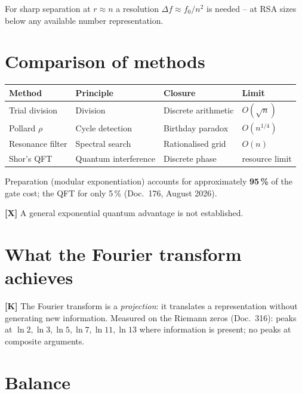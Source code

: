 For sharp separation at $r \approx n$ a resolution $\Delta f \approx
f_0/n^2$ is needed -- at RSA sizes below any available number
representation.

\section{Comparison of methods}

\begin{center}
\begin{tabular}{llll}
\toprule
Method & Principle & Closure & Limit \\
\midrule
Trial division & Division & Discrete arithmetic & $O(\sqrt{n})$ \\
Pollard $\rho$ & Cycle detection & Birthday paradox & $O(n^{1/4})$ \\
Resonance filter & Spectral search & Rationalised grid & $O(n)$ \\
Shor's QFT & Quantum interference & Discrete phase &
  resource limit \\
\bottomrule
\end{tabular}
\end{center}

Preparation (modular exponentiation) accounts for approximately
\textbf{95\,\%} of the gate cost; the QFT for only 5\,\%
(Doc.~176, August 2026).

\textbf{[X]} A general exponential quantum advantage is not established.

\section{What the Fourier transform achieves}

\textbf{[K]} The Fourier transform is a \emph{projection}: it translates
a representation without generating new information. Measured on the
Riemann zeros (Doc.~316): peaks at $\ln 2,\ln 3,\ln 5,\ln 7,\ln 11,
\ln 13$ where information is present; no peaks at composite arguments.

\section{Balance}

